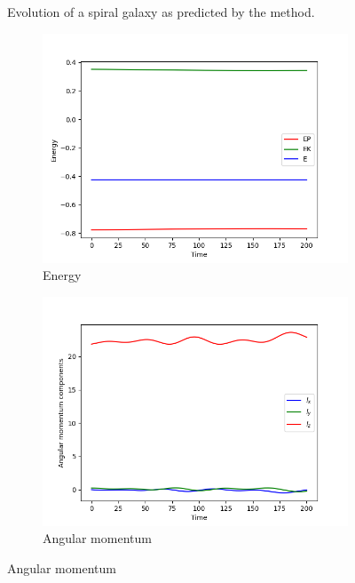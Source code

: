\begin{figure}[H]
    \caption{Evolution of a spiral galaxy as predicted by the \PThreeM{} method.}
    \label{fig:spiral-galaxy-evolution-p3m}
\end{figure}

\begin{figure}[H]
    \centering
    \begin{subfigure}[b]{0.5\textwidth}
        \centering
        \includegraphics[width=\textwidth]{chapters/results/img/p3m-galaxy/energy.png}
        \caption{Energy}
        \label{fig:physical-quantities-p3m-sub1}
    \end{subfigure}

    \vspace{0.2cm}

    \begin{subfigure}[b]{0.5\textwidth}
        \centering
        \includegraphics[width=\textwidth]{chapters/results/img/p3m-galaxy/angular-momentum.png}
        \caption{Angular momentum}
        \label{fig:physical-quantities-p3m-sub2}
    \end{subfigure}


\end{figure}
